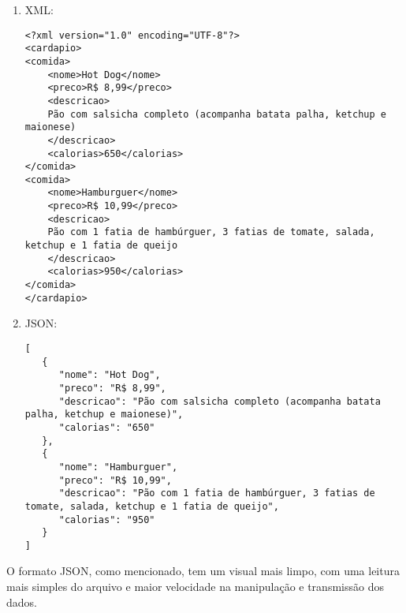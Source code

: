 \documentclass[../../layout.tex]{subfiles}
\begin{document}
\begin{enumerate}[label=\alph*)]
\itemsep0em
  \item XML:
    \begin{verbatim}
<?xml version="1.0" encoding="UTF-8"?>
<cardapio>
<comida>
    <nome>Hot Dog</nome>
    <preco>R$ 8,99</preco>
    <descricao>
   	Pão com salsicha completo (acompanha batata palha, ketchup e maionese)
   	</descricao>
    <calorias>650</calorias>
</comida>
<comida>
    <nome>Hamburguer</nome>
    <preco>R$ 10,99</preco>
    <descricao>
    Pão com 1 fatia de hambúrguer, 3 fatias de tomate, salada, ketchup e 1 fatia de queijo
    </descricao>
    <calorias>950</calorias>
</comida>
</cardapio>
    \end{verbatim}
  
  \item JSON:
    \begin{verbatim}
[
   {
      "nome": "Hot Dog",
      "preco": "R$ 8,99",
      "descricao": "Pão com salsicha completo (acompanha batata palha, ketchup e maionese)",
      "calorias": "650"
   },
   {
      "nome": "Hamburguer",
      "preco": "R$ 10,99",
      "descricao": "Pão com 1 fatia de hambúrguer, 3 fatias de tomate, salada, ketchup e 1 fatia de queijo",
      "calorias": "950"
   }
]
    \end{verbatim}
\end{enumerate}

O formato JSON, como mencionado, tem um visual mais limpo, com uma leitura mais simples do arquivo e maior velocidade na manipulação e transmissão dos dados.
\end{document}
